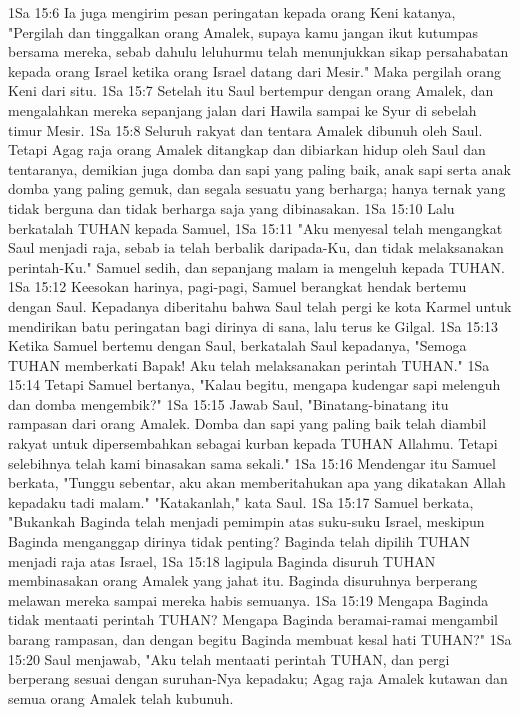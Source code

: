 1Sa 15:6  Ia juga mengirim pesan peringatan kepada orang Keni katanya, "Pergilah dan tinggalkan orang Amalek, supaya kamu jangan ikut kutumpas bersama mereka, sebab dahulu leluhurmu telah menunjukkan sikap persahabatan kepada orang Israel ketika orang Israel datang dari Mesir." Maka pergilah orang Keni dari situ.
1Sa 15:7  Setelah itu Saul bertempur dengan orang Amalek, dan mengalahkan mereka sepanjang jalan dari Hawila sampai ke Syur di sebelah timur Mesir.
1Sa 15:8  Seluruh rakyat dan tentara Amalek dibunuh oleh Saul. Tetapi Agag raja orang Amalek ditangkap dan dibiarkan hidup oleh Saul dan tentaranya, demikian juga domba dan sapi yang paling baik, anak sapi serta anak domba yang paling gemuk, dan segala sesuatu yang berharga; hanya ternak yang tidak berguna dan tidak berharga saja yang dibinasakan.
1Sa 15:10  Lalu berkatalah TUHAN kepada Samuel,
1Sa 15:11  "Aku menyesal telah mengangkat Saul menjadi raja, sebab ia telah berbalik daripada-Ku, dan tidak melaksanakan perintah-Ku." Samuel sedih, dan sepanjang malam ia mengeluh kepada TUHAN.
1Sa 15:12  Keesokan harinya, pagi-pagi, Samuel berangkat hendak bertemu dengan Saul. Kepadanya diberitahu bahwa Saul telah pergi ke kota Karmel untuk mendirikan batu peringatan bagi dirinya di sana, lalu terus ke Gilgal.
1Sa 15:13  Ketika Samuel bertemu dengan Saul, berkatalah Saul kepadanya, "Semoga TUHAN memberkati Bapak! Aku telah melaksanakan perintah TUHAN."
1Sa 15:14  Tetapi Samuel bertanya, "Kalau begitu, mengapa kudengar sapi melenguh dan domba mengembik?"
1Sa 15:15  Jawab Saul, "Binatang-binatang itu rampasan dari orang Amalek. Domba dan sapi yang paling baik telah diambil rakyat untuk dipersembahkan sebagai kurban kepada TUHAN Allahmu. Tetapi selebihnya telah kami binasakan sama sekali."
1Sa 15:16  Mendengar itu Samuel berkata, "Tunggu sebentar, aku akan memberitahukan apa yang dikatakan Allah kepadaku tadi malam." "Katakanlah," kata Saul.
1Sa 15:17  Samuel berkata, "Bukankah Baginda telah menjadi pemimpin atas suku-suku Israel, meskipun Baginda menganggap dirinya tidak penting? Baginda telah dipilih TUHAN menjadi raja atas Israel,
1Sa 15:18  lagipula Baginda disuruh TUHAN membinasakan orang Amalek yang jahat itu. Baginda disuruhnya berperang melawan mereka sampai mereka habis semuanya.
1Sa 15:19  Mengapa Baginda tidak mentaati perintah TUHAN? Mengapa Baginda beramai-ramai mengambil barang rampasan, dan dengan begitu Baginda membuat kesal hati TUHAN?"
1Sa 15:20  Saul menjawab, "Aku telah mentaati perintah TUHAN, dan pergi berperang sesuai dengan suruhan-Nya kepadaku; Agag raja Amalek kutawan dan semua orang Amalek telah kubunuh.
